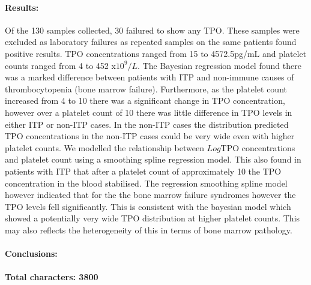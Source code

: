 \documentclass[11pt]{article}
\begin{document}
\paragraph{Results:} Of the 130 samples collected, 30 failured to show any TPO. These samples were excluded as laboratory failures as repeated samples on the same patients found positive results. TPO concentrations ranged from 15 to 4572.5pg/mL and platelet counts ranged from 4 to 452 x$10^9/L$. The Bayesian regression model found there was a marked difference between patients with ITP and non-immune causes of thrombocytopenia (bone marrow failure). Furthermore, as the platelet count increased from 4 to 10 there was a significant change in TPO concentration, however over a platelet count of 10 there was little difference in TPO levels in either ITP or non-ITP cases. In the non-ITP cases the distribution predicted TPO concentrations in the non-ITP cases could be very wide even with higher platelet counts. We modelled the relationship between $Log$TPO concentrations and platelet count using a smoothing spline regression model. This also found in patients with ITP that after a platelet count of approximately 10 the TPO concentration in the blood stabilised. The regression smoothing spline model however indicated that for the the bone marrow failure syndromes however the TPO levels fell significantly. This is consistent with the bayesian model which showed a potentially very wide TPO distribution at higher platelet counts. This may also reflects the heterogeneity of this in terms of bone marrow pathology.
\paragraph{Conclusions:}


\paragraph{}
\textbf{Total characters: 3800}
\end{document}
